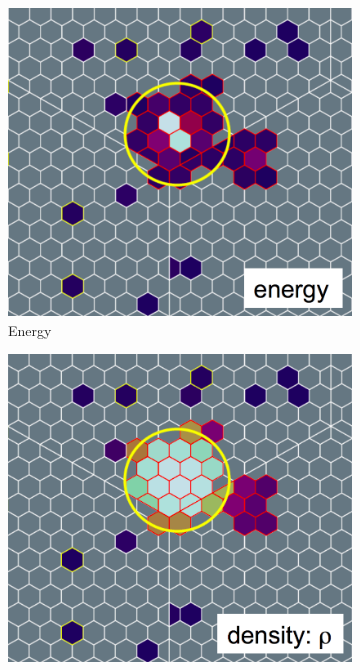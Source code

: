 \begin{figure}[h!]
  \centering
  \begin{subfigure}{0.292\textwidth}
    \includegraphics[width=\textwidth]{Figures/HGCAL/ClusteringAlgo_Energy.png}
    \caption{Energy}
  \end{subfigure}
  \begin{subfigure}{0.292\textwidth}
    \includegraphics[width=\textwidth]{Figures/HGCAL/ClusteringAlgo_Density.png}

\end{subfigure}
\end{figure}
